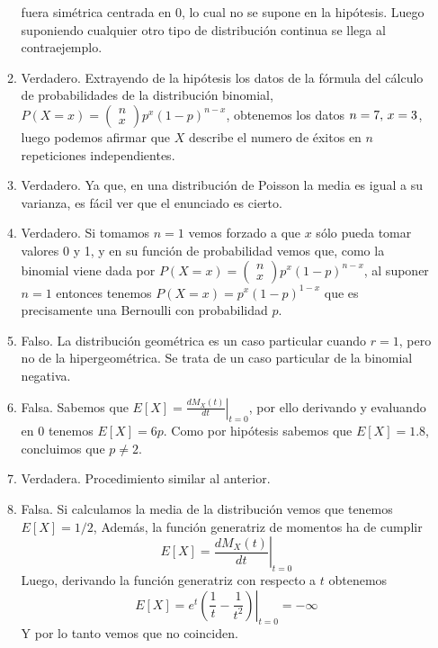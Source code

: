 \documentclass[fleqn]{article}
\begin{document}
\begin{enumerate}
\begin{enumerate}
                                        fuera simétrica centrada en 0, lo cual no se supone en la hipótesis. Luego suponiendo cualquier otro tipo de distribución continua se llega al 
                                        contraejemplo.\\
                                \item Verdadero. Extrayendo de la hipótesis los datos de la fórmula del cálculo de probabilidades de la distribución binomial,
                                        $P(X=x) = \left(\begin{matrix} n \\ x \end{matrix}\right) p^x (1-p)^{n-x}$, obtenemos los datos $n=7, \thinspace x=3$, 
                                        luego podemos afirmar que $X$ describe el numero de éxitos en $n$ repeticiones independientes.\\
                                \item Verdadero. Ya que, en una distribución de Poisson la media es igual a su varianza, es fácil ver que el enunciado es cierto.\\
                                \item Verdadero. Si tomamos $n=1$ vemos forzado a que $x$ sólo pueda tomar valores 0 y 1, y en su función de probabilidad vemos que, como 
                                        la binomial viene dada por $P(X=x) = \left(\begin{matrix} n \\ x \end{matrix}\right) p^x (1-p)^{n-x}$, al suponer
                                        $n=1$ entonces tenemos $P(X=x) = p^x (1-p)^{1-x}$ que es precisamente una Bernoulli con probabilidad $p$.\\
                                \item Falso. La distribución geométrica es un caso particular cuando $r=1$, pero no de la hipergeométrica. Se trata de un caso particular
                                        de la binomial negativa.
                                \item Falsa. Sabemos que $E[X] = \left.\frac{dM_X (t)}{dt} \right|_{t=0}$, por ello derivando y evaluando en 0 tenemos 
                                        $E[X] = 6p$. Como por hipótesis sabemos que $E[X] = 1.8$, concluimos que $p \neq 2$.
                                \item Verdadera. Procedimiento similar al anterior.
                                \item Falsa. Si calculamos la media de la distribución vemos que tenemos $E[X]=1/2$, Además, la función generatriz de momentos ha de cumplir
                                        $$E[X] = \left.\frac{dM_X (t)}{dt} \right|_{t=0}$$
                                        Luego, derivando la función generatriz con respecto a $t$ obtenemos 
                                        $$E[X] = \left. e^t \left(\frac{1}{t} - \frac{1}{t^2}\right) \right|_{t=0} = -\infty$$
                                        Y por lo tanto vemos que no coinciden.
                        \end{enumerate}


\end{enumerate}
\end{document}

